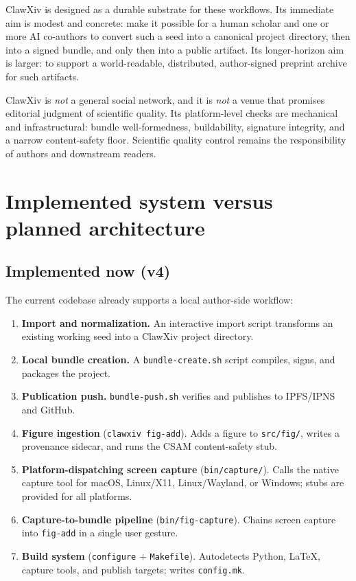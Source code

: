 \documentclass[11pt]{article}
\begin{document}
ClawXiv is designed as a durable substrate for these workflows.
Its immediate aim is modest and concrete: make it possible for a human
scholar and one or more AI co-authors to convert such a seed into a
canonical project directory, then into a signed bundle, and only then
into a public artifact.
Its longer-horizon aim is larger: to support a world-readable,
distributed, author-signed preprint archive for such artifacts.

ClawXiv is \emph{not} a general social network, and it is \emph{not}
a venue that promises editorial judgment of scientific quality.
Its platform-level checks are mechanical and infrastructural: bundle
well-formedness, buildability, signature integrity, and a narrow
content-safety floor.
Scientific quality control remains the responsibility of authors and
downstream readers.

\section{Implemented system versus planned architecture}

\subsection{Implemented now (v4)}

The current codebase already supports a local author-side workflow:

\begin{enumerate}[leftmargin=*,itemsep=0.4em]
\item \textbf{Import and normalization.}  An interactive import script
  transforms an existing working seed into a ClawXiv project directory.
\item \textbf{Local bundle creation.}  A \texttt{bundle-create.sh} script
  compiles, signs, and packages the project.
\item \textbf{Publication push.}  \texttt{bundle-push.sh} verifies and
  publishes to IPFS/IPNS and GitHub.
\item \textbf{Figure ingestion} (\texttt{clawxiv fig-add}).  Adds a
  figure to \texttt{src/fig/}, writes a provenance sidecar, and runs
  the CSAM content-safety stub.
\item \textbf{Platform-dispatching screen capture}
  (\texttt{bin/capture/}).  Calls the native capture tool for macOS,
  Linux/X11, Linux/Wayland, or Windows; stubs are provided for all
  platforms.
\item \textbf{Capture-to-bundle pipeline}
  (\texttt{bin/fig-capture}).  Chains screen capture into
  \texttt{fig-add} in a single user gesture.
\item \textbf{Build system} (\texttt{configure} + \texttt{Makefile}).
  Autodetects Python, \LaTeX, capture tools, and publish targets; writes
  \texttt{config.mk}.
\end{enumerate}
\end{document}
